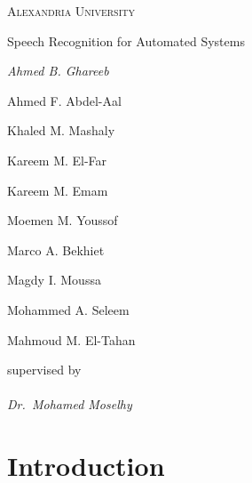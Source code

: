 \documentclass[12pt, a4paper, twoside]{report}
\begin{document}
\begin{titlepage}
	\begin{flushright}
		{\scshape Alexandria University\\}
		{\huge Speech Recognition for Automated Systems\par}
	\end{flushright}
	\vfill
	{\Large\itshape
		Ahmed B. Ghareeb\par
		Ahmed F. Abdel-Aal\par
		Khaled M. Mashaly\par
		Kareem M. El-Far\par
		Kareem M. Emam\par
		Moemen M. Youssof\par
		Marco A. Bekhiet\par
		Magdy I. Moussa\par
		Mohammed A. Seleem\par
		Mahmoud M. El-Tahan\par
	}
	\vspace{1cm}
	supervised by\\ \\
	{\Large\itshape Dr.~Mohamed Moselhy}
\end{titlepage}

\begin{abstract}
Speech is the way of communication between the human. It also defined as it is a process which automatically recognizes the spoken words of person based on given speech signal information. It is also known as Automatic Speech Recognition or computer speech recognition and speech to text conversion. Automatic speech recognition is the very interesting area of research and lots of research work has been done by number of researchers. To recognize the speech feature extraction and word recognition these two steps are followed. After feature extraction feature matching is performed for word recognition. This project describe the different feature extractions techniques like MFCC and DWT (combined with LPC) and pattern recognition which is done by using 4 different techniques like neural network (NN), hidden markov model (HMM), gaussian mixture model (GMM) and dynamic time warping (DTW).
\end{abstract}

\printglossary[type=\acronymtype]

\tableofcontents

\chapter{Introduction}
\end{document}
